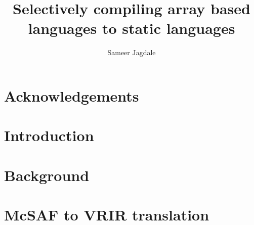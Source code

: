 \documentclass[MSc,twoside,openright]{Thesis}
\title{Selectively compiling array based languages to static languages}
\author{Sameer Jagdale}
\begin{document}
\pagestyle{empty}

\maketitle
\cleardoublepage


\preface %

\begin{Abstract}

\end{Abstract}

\begin{Resume}

\end{Resume}

\chapter*{Acknowledgements}



\renewcommand{\contentsname}{Table of Contents}%
\addto\captionsenglish{%
  \renewcommand{\contentsname}%
    {Table of Contents}%
}
\addto\captionsenglish{%
  \renewcommand{\lstlistlistingname}%
    {List of Listings}%
}

\tableofcontents
\listoffigures
\listoftables
\renewcommand{\lstlistlistingname}{List of Listings}
\cleardoublepage

\maintext %

\pagestyle{fancyplain}

\chapter{Introduction} \label{chap:Introduction}

\chapter{Background} \label{chap: Background}

\chapter{McSAF to VRIR translation} \label{chap: McSAFTranslate}

\end{document}
